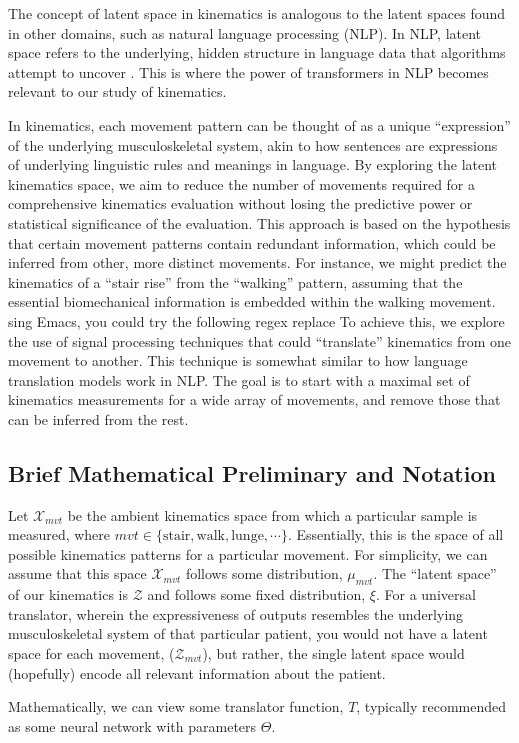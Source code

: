 The concept of latent space in kinematics is analogous to the latent spaces found in other domains, such as natural language processing (NLP).
In NLP, latent space refers to the underlying, hidden structure in language data that algorithms attempt to uncover \cite{jurafskySpeechLanguageProcessing2009}.
This is where the power of transformers \cite{vaswaniAttentionAllYou2017} in NLP becomes relevant to our study of kinematics.

In kinematics, each movement pattern can be thought of as a unique ``expression'' of the underlying musculoskeletal system, akin to how sentences are expressions of underlying linguistic rules and meanings in language.
By exploring the latent kinematics space, we aim to reduce the number of movements required for a comprehensive kinematics evaluation without losing the predictive power or statistical significance of the evaluation.
This approach is based on the hypothesis that certain movement patterns contain redundant information, which could be inferred from other, more distinct movements.
For instance, we might predict the kinematics of a ``stair rise'' from the ``walking'' pattern, assuming that the essential biomechanical information is embedded within the walking movement.
sing Emacs, you could try the following regex replace
To achieve this, we explore the use of signal processing techniques that could ``translate'' kinematics from one movement to another.
This technique is somewhat similar to how language translation models work in NLP.
The goal is to start with a maximal set of kinematics measurements for a wide array of movements, and remove those that can be inferred from the rest.

\subsection{Brief Mathematical Preliminary and Notation}
Let $\mathcal{X}_{mvt}$ be the ambient kinematics space from which a particular sample is measured, where $mvt \in \{\text{stair},\text{walk}, \text{lunge}, \cdots\}$.
Essentially, this is the space of all possible kinematics patterns for a particular movement.
For simplicity, we can assume that this space $\mathcal{X}_{mvt}$ follows some distribution, $\mu_{mvt}$.
The ``latent space'' of our kinematics is $\mathcal{Z}$ and follows some fixed distribution, $\xi$.
For a universal translator, wherein the expressiveness of outputs resembles the underlying musculoskeletal system of that particular patient, you would not have a latent space for each movement, ($\mathcal{Z}_{mvt}$), but rather, the single latent space would (hopefully) encode all relevant information about the patient.

Mathematically, we can view some translator function, $T$, typically recommended as some neural network with parameters $\Theta$.

